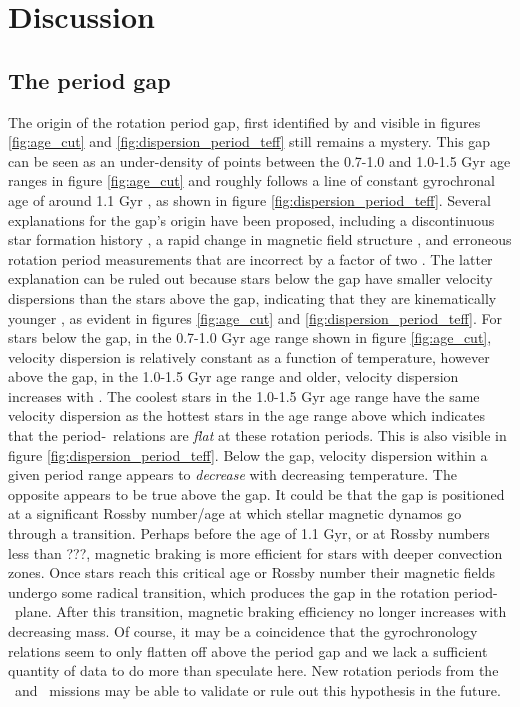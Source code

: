 \section{Discussion}
\label{sec:discussion}

\subsection{The period gap}
\label{sec:period_gap}

The origin of the rotation period gap, first identified
by \citet{mcquillan2013} and visible in figures \ref{fig:age_cut} and
\ref{fig:dispersion_period_teff} still remains a mystery.
This gap can be seen as an under-density of points between the 0.7-1.0 and
1.0-1.5 Gyr age ranges in figure \ref{fig:age_cut} and roughly follows a line
of constant gyrochronal age of around 1.1 Gyr \citep[according to the
gyrochronology relation of][]{angus2019}, as shown in figure
\ref{fig:dispersion_period_teff}.
Several explanations for the gap's origin have been proposed, including a
discontinuous star formation history \citep{mcquillan2013, davenport2017,
davenport2018}, a rapid change in magnetic field structure
\citep{reinhold2019}, and erroneous rotation period measurements that are
incorrect by a factor of two \citep{koen2018}.
The latter explanation can be ruled out because stars below the gap have
smaller velocity dispersions than the stars above the gap, indicating that
they are kinematically younger \citep{mcquillan2013, davenport2018}, as
evident in figures \ref{fig:age_cut} and \ref{fig:dispersion_period_teff}.
For stars below the gap, in the 0.7-1.0 Gyr age range shown in figure
\ref{fig:age_cut}, velocity dispersion is relatively constant as a function of
temperature, however above the gap, in the 1.0-1.5 Gyr age range and older,
velocity dispersion increases with \teff.
The coolest stars in the 1.0-1.5 Gyr age range have the same velocity
dispersion as the hottest stars in the age range above which indicates that
the period-\teff\ relations are {\it flat} at these rotation periods.
This is also visible in figure \ref{fig:dispersion_period_teff}.
Below the gap, velocity dispersion within a given period range appears to {\it
decrease} with decreasing temperature.
The opposite appears to be true above the gap.
It could be that the gap is positioned at a significant Rossby number/age at
which stellar magnetic dynamos go through a transition.
Perhaps before the age of 1.1 Gyr, or at Rossby numbers less than ???,
magnetic braking is more efficient for stars with deeper convection zones.
Once stars reach this critical age or Rossby number their magnetic fields
undergo some radical transition, which produces the gap in the rotation
period-\teff\ plane.
After this transition, magnetic braking efficiency no longer increases with
decreasing mass.
Of course, it may be a coincidence that the gyrochronology relations seem to
only flatten off above the period gap and we lack a sufficient quantity of
data to do more than speculate here.
New rotation periods from the \ktwo\ and \tess\ missions may be able to
validate or rule out this hypothesis in the future.

